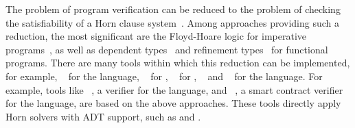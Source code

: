 The problem of program verification can be reduced to the problem of checking the satisfiability of a Horn clause system~\cite{10.1145/2254064.2254112,Bjorner2015}.
Among approaches providing such a reduction, the most significant are the Floyd-Hoare logic for imperative programs~\cite{Floyd1993,10.1145/363235.363259}, as well as dependent types~\cite{10.1145/292540.292560} and refinement types~\cite{713327} for functional programs.
There are many tools within which this reduction can be implemented, for example, \liquidHaskell{}~\cite{10.1145/2692915.2628161} for the \haskell{} language, \rcaml{}~\cite{10.1007/978-3-319-63390-9_30} for \ocaml{}, \flux{}~\cite{https://doi.org/10.48550/arxiv.2207.04034} for \rust{}, \leon{}~\cite{10.1007/978-3-642-23702-7_23} and \stainless{}~\cite{10.1145/3360592} for the \scala{} language.
For example, tools like \rustHorn{}~\cite{10.1145/3462205}, a verifier for the \rust{} language, and \solCMC{}~\cite{10.1007/978-3-031-13185-1_16}, a smart contract verifier for the \solidity{} language, are based on the above approaches. These tools directly apply Horn solvers with ADT support, such as \spacer{} and \eldarica{}.


